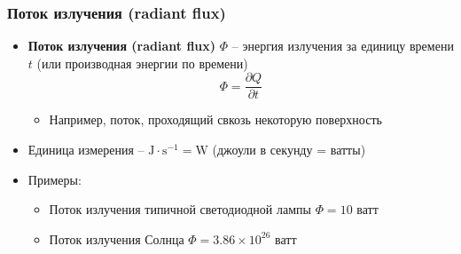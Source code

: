 \documentclass[handout,10pt]{beamer}
\begin{document}
\begin{frame}
\frametitle{Поток излучения (radiant flux)}
\begin{itemize}
\item \textbf{Поток излучения (radiant flux)} \begin{math}\Phi\end{math} -- энергия излучения за единицу времени \begin{math}t\end{math} (или производная энергии по времени)
\begin{equation*}
\Phi = \frac{\partial Q}{\partial t}
\end{equation*}
\pause
\begin{itemize}
\item Например, поток, проходящий свкозь некоторую поверхность
\end{itemize}
\pause
\item Единица измерения -- \begin{math}\text{J}\cdot \text{s}^{-1} = \text{W}\end{math} (джоули в секунду = ватты)
\pause
\item Примеры:
\begin{itemize}
\item Поток излучения типичной светодиодной лампы \begin{math}\Phi = 10\end{math} ватт
\pause
\item Поток излучения Солнца \begin{math}\Phi = 3.86 \times 10^{26}\end{math} ватт
\end{itemize}
\end{itemize}
\end{frame}
\end{document}
